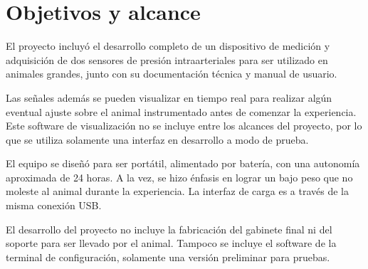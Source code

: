 \section{Objetivos y alcance}

El proyecto incluyó el desarrollo completo de un dispositivo de medición y adquisición de dos sensores de presión intraarteriales para ser utilizado en animales grandes, junto con su documentación técnica y manual de usuario. 

Las señales además se pueden visualizar en tiempo real para realizar algún eventual ajuste sobre el animal instrumentado antes de comenzar la experiencia. Este software de visualización no se incluye entre los alcances del proyecto, por lo que se utiliza solamente una interfaz en desarrollo a modo de prueba. 

El equipo se diseñó para ser portátil, alimentado por batería, con una autonomía aproximada de 24 horas. A la vez, se hizo énfasis en lograr un bajo peso que no moleste al animal durante la experiencia. La interfaz de carga es a través de la misma conexión USB.

El desarrollo del proyecto no incluye la fabricación del gabinete final ni del soporte para ser llevado por el animal. Tampoco se incluye el software de la terminal de configuración, solamente una versión preliminar para pruebas.

